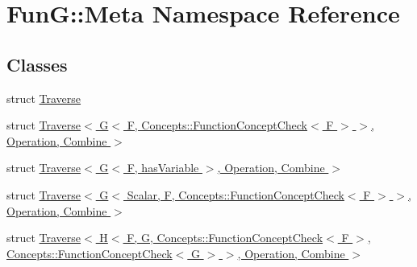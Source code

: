 \hypertarget{namespaceFunG_1_1Meta}{}\section{FunG\+:\+:Meta Namespace Reference}
\label{namespaceFunG_1_1Meta}
\subsection*{Classes}
\begin{DoxyCompactItemize}
\item 
struct \hyperlink{structFunG_1_1Meta_1_1Traverse}{Traverse}
\item 
struct \hyperlink{structFunG_1_1Meta_1_1Traverse_3_01G_3_01F_00_01Concepts_1_1FunctionConceptCheck_3_01F_01_4_01_473eb79b17eeedd14b27190d68eb8ea5c}{Traverse$<$ G$<$ F, Concepts\+::\+Function\+Concept\+Check$<$ F $>$ $>$, Operation, Combine $>$}
\item 
struct \hyperlink{structFunG_1_1Meta_1_1Traverse_3_01G_3_01F_00_01hasVariable_01_4_00_01Operation_00_01Combine_01_4}{Traverse$<$ G$<$ F, has\+Variable $>$, Operation, Combine $>$}
\item 
struct \hyperlink{structFunG_1_1Meta_1_1Traverse_3_01G_3_01Scalar_00_01F_00_01Concepts_1_1FunctionConceptCheck_3_056d96032cb56cdcfc81b282c6fc44c83}{Traverse$<$ G$<$ Scalar, F, Concepts\+::\+Function\+Concept\+Check$<$ F $>$ $>$, Operation, Combine $>$}
\item 
struct \hyperlink{structFunG_1_1Meta_1_1Traverse_3_01H_3_01F_00_01G_00_01Concepts_1_1FunctionConceptCheck_3_01F_013370ce68fd07becd92320937a020c699}{Traverse$<$ H$<$ F, G, Concepts\+::\+Function\+Concept\+Check$<$ F $>$, Concepts\+::\+Function\+Concept\+Check$<$ G $>$ $>$, Operation, Combine $>$}
\end{DoxyCompactItemize}
